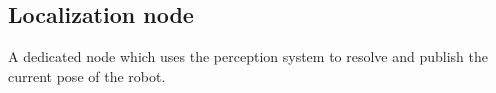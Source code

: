\subsection{Localization node} A dedicated node which uses the perception system to resolve and publish the current pose of the robot.
